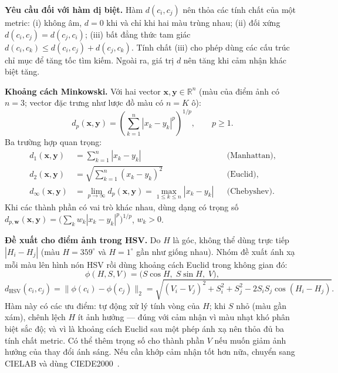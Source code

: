 \textbf{Yêu cầu đối với hàm dị biệt.} Hàm $d(c_i, c_j)$ nên thỏa các tính chất của một metric: (i) không âm, $d = 0$ khi và chỉ khi hai màu trùng nhau; (ii) đối xứng $d(c_i, c_j) = d(c_j, c_i)$; (iii) bất đẳng thức tam giác $d(c_i, c_k) \le d(c_i, c_j) + d(c_j, c_k)$. Tính chất (iii) cho phép dùng các cấu trúc chỉ mục để tăng tốc tìm kiếm. Ngoài ra, giá trị $d$ nên tăng khi cảm nhận khác biệt tăng.

\textbf{Khoảng cách Minkowski.} Với hai vector $\mathbf{x}, \mathbf{y} \in \mathbb{R}^n$ (màu của điểm ảnh có $n = 3$; vector đặc trưng như lược đồ màu có $n = K$ ô):
\begin{equation}
d_p(\mathbf{x}, \mathbf{y}) = \left( \sum_{k=1}^{n} |x_k - y_k|^p \right)^{1/p}, \qquad p \ge 1.
\label{eq:w4_minkowski}
\end{equation}
Ba trường hợp quan trọng:
\begin{align}
d_1(\mathbf{x}, \mathbf{y}) &= \sum_{k=1}^{n} |x_k - y_k| && \text{(Manhattan)}, \\
d_2(\mathbf{x}, \mathbf{y}) &= \sqrt{\sum_{k=1}^{n} (x_k - y_k)^2} && \text{(Euclid)}, \\
d_\infty(\mathbf{x}, \mathbf{y}) &= \lim_{p \to \infty} d_p(\mathbf{x}, \mathbf{y}) = \max_{1 \le k \le n} |x_k - y_k| && \text{(Chebyshev)}.
\end{align}
Khi các thành phần có vai trò khác nhau, dùng dạng có trọng số $d_{p,\mathbf{w}}(\mathbf{x}, \mathbf{y}) = \big( \sum_k w_k |x_k - y_k|^p \big)^{1/p}$, $w_k > 0$.

\textbf{Đề xuất cho điểm ảnh trong HSV.} Do $H$ là góc, không thể dùng trực tiếp $|H_i - H_j|$ (màu $H = 359^\circ$ và $H = 1^\circ$ gần như giống nhau). Nhóm đề xuất ánh xạ mỗi màu lên hình nón HSV rồi dùng khoảng cách Euclid trong không gian đó:
\begin{equation}
\phi(H, S, V) = \big( S \cos H,\; S \sin H,\; V \big),
\end{equation}
\begin{equation}
d_{\text{HSV}}(c_i, c_j) = \big\| \phi(c_i) - \phi(c_j) \big\|_2
= \sqrt{(V_i - V_j)^2 + S_i^2 + S_j^2 - 2 S_i S_j \cos(H_i - H_j)}.
\label{eq:w4_dhsv}
\end{equation}
Hàm này có các ưu điểm: tự động xử lý tính vòng của $H$; khi $S$ nhỏ (màu gần xám), chênh lệch $H$ ít ảnh hưởng — đúng với cảm nhận vì màu nhạt khó phân biệt sắc độ; và vì là khoảng cách Euclid sau một phép ánh xạ nên thỏa đủ ba tính chất metric. Có thể thêm trọng số cho thành phần $V$ nếu muốn giảm ảnh hưởng của thay đổi ánh sáng. Nếu cần khớp cảm nhận tốt hơn nữa, chuyển sang CIELAB và dùng CIEDE2000~\citep{sharma2005ciede2000}.

